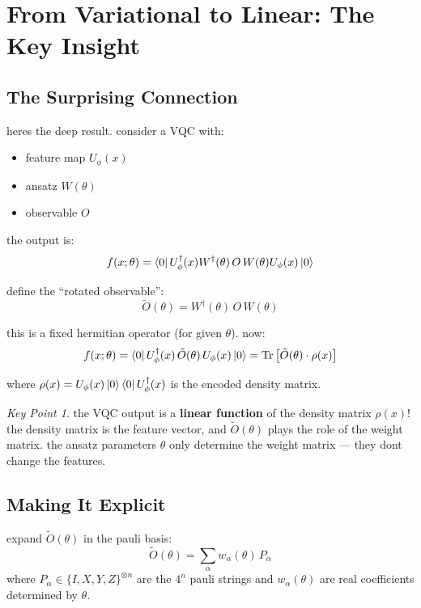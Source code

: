 \documentclass[11pt,a4paper]{article}
\theoremstyle{definition}
\theoremstyle{remark}
\newtheorem*{keypoint}{Key Point}
\begin{document}
\section{From Variational to Linear: The Key Insight}

\subsection{The Surprising Connection}

heres the deep result. consider a VQC with:
\begin{itemize}
    \item feature map $U_\phi(x)$
    \item ansatz $W(\theta)$
    \item observable $O$
\end{itemize}

the output is:
\[
f(x; \theta) = \bra{0} U_\phi^\dagger(x) W^\dagger(\theta) \, O \, W(\theta) U_\phi(x) \ket{0}
\]

define the ``rotated observable'':
\[
\tilde{O}(\theta) = W^\dagger(\theta) \, O \, W(\theta)
\]

this is a fixed hermitian operator (for given $\theta$). now:
\[
f(x; \theta) = \bra{0} U_\phi^\dagger(x) \, \tilde{O}(\theta) \, U_\phi(x) \ket{0} = \text{Tr}\left[\tilde{O}(\theta) \cdot \rho(x)\right]
\]

where $\rho(x) = U_\phi(x)\ket{0}\bra{0}U_\phi^\dagger(x)$ is the encoded density matrix.

\begin{keypoint}
the VQC output is a \textbf{linear function} of the density matrix $\rho(x)$! the density matrix is the feature vector, and $\tilde{O}(\theta)$ plays the role of the weight matrix. the ansatz parameters $\theta$ only determine the weight matrix --- they dont change the features.
\end{keypoint}

\subsection{Making It Explicit}

expand $\tilde{O}(\theta)$ in the pauli basis:
\[
\tilde{O}(\theta) = \sum_{\alpha} w_\alpha(\theta) \, P_\alpha
\]
where $P_\alpha \in \{I, X, Y, Z\}^{\otimes n}$ are the $4^n$ pauli strings and $w_\alpha(\theta)$ are real coefficients determined by $\theta$.
\end{document}
